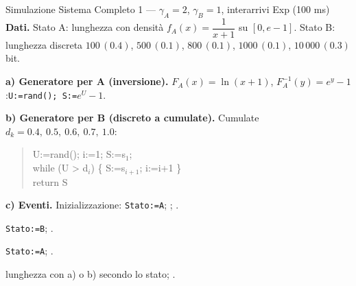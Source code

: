 \begin{esempio}{Simulazione Sistema Completo 1 --- $\gamma_A=2$, $\gamma_B=1$, interarrivi Exp (100 ms)}
\textbf{Dati.} Stato A: lunghezza con densità $f_A(x)=\dfrac1{x+1}$ su $[0,e-1]$. Stato B: lunghezza discreta $100\,(0.4)$, $500\,(0.1)$, $800\,(0.1)$, $1000\,(0.1)$, $10\,000\,(0.3)$ bit.

\textbf{a) Generatore per A (inversione).} $F_A(x)=\ln(x+1)$, $F_A^{-1}(y)=e^y-1$:\quad \texttt{U:=rand(); S:=}$e^{U}-1$.

\textbf{b) Generatore per B (discreto a cumulate).} Cumulate $d_k=0.4,\ 0.5,\ 0.6,\ 0.7,\ 1.0$:
\begin{quote}\ttfamily\small
U:=rand(); i:=1; S:=s$_1$;\\
while (U > d$_i$) \{ S:=s$_{i+1}$; i:=i+1 \}\\
return S
\end{quote}
\textbf{c) Eventi.} Inizializzazione: \texttt{Stato:=A}; ; .
\begin{description}[leftmargin=*,nosep]
\item[A$\to$B] \texttt{Stato:=B}; .
\item[B$\to$A] \texttt{Stato:=A}; .
\item[Generazione] lunghezza con a) o b) secondo lo stato; .
\end{description}
\end{esempio}

